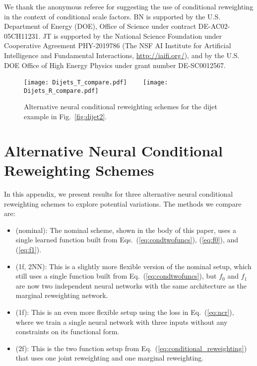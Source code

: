 \documentclass[aps,prx,reprint,preprintnumbers,superscriptaddress,nofootinbib,longbibliography,floatfix]{revtex4-2}
\DeclareRobustCommand{\Fig}[1]{Fig.~\ref{fig:#1}}
\DeclareRobustCommand{\Eq}[1]{Eq.~(\ref{eq:#1})}
\DeclareRobustCommand{\Eqss}[3]{Eqs.~(\ref{eq:#1}), (\ref{eq:#2}), and (\ref{eq:#3})}
\begin{document}
\begin{acknowledgments}

We thank the anonymous referee for suggesting the use of conditional reweighting in the context of conditional scale factors.
%
BN is supported by the U.S. Department of Energy (DOE), Office of Science under contract DE-AC02-05CH11231.
%
JT is supported by the National Science Foundation under Cooperative Agreement PHY-2019786 (The NSF AI Institute for Artificial Intelligence and Fundamental Interactions, \url{http://iaifi.org/}), and by the U.S. DOE Office of High Energy Physics under grant number DE-SC0012567.
%

\end{acknowledgments}



\FloatBarrier


\begin{figure*}[t]
    \centering     
     \texttt{[image: Dijets\_T\_compare.pdf]}$\qquad$
     \texttt{[image: Dijets\_R\_compare.pdf]}
    \caption{Alternative neural conditional reweighting schemes for the dijet example in \Fig{dijet2}.}
    \label{fig:alt2}
\end{figure*}

\appendix



\section{Alternative Neural Conditional Reweighting Schemes}
\label{app:alt}



In this appendix, we present results for three alternative neural conditional reweighting schemes to explore potential variations.
%
The methods we compare are:
%
\begin{itemize}
    \item (nominal):  The nominal scheme, shown in the body of this paper, uses a single learned function built from \Eqss{condtwofuncs}{f0}{f1}.
    \item (1f, 2NN):  This is a slightly more flexible version of the nominal setup, which still uses a single function built from \Eq{condtwofuncs}, but $f_0$ and $f_1$ are now two independent neural networks with the same architecture as the marginal reweighting network.
    \item (1f):  This is an even more flexible setup using the loss in \Eq{ncr}, where we train a single neural network with three inputs without any constraints on its functional form.
    \item (2f):  This is the two function setup from \Eq{conditional_reweighting} that uses one joint reweighting and one marginal reweighting.
\end{itemize}
\end{document}
